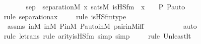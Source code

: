 \begin{isabellebody}
\isamarkupfalse%
\ {\isacharminus}{\kern0pt}\ \isanewline
\ \ \isamarkupfalse%
\ sep\ {\isacharcolon}{\kern0pt}\ {\isachardoublequoteopen}separation{\isacharparenleft}{\kern0pt}{\isacharhash}{\kern0pt}{\isacharhash}{\kern0pt}M{\isacharcomma}{\kern0pt}\ {\isasymlambda}x{\isachardot}{\kern0pt}\ sats{\isacharparenleft}{\kern0pt}M{\isacharcomma}{\kern0pt}\ is{\isacharunderscore}{\kern0pt}HS{\isacharunderscore}{\kern0pt}fm{\isacharparenleft}{\kern0pt}{}{\isacharcomma}{\kern0pt}\ {}{\isacharparenright}{\kern0pt}{\isacharcomma}{\kern0pt}\ {\isacharbrackleft}{\kern0pt}x{\isacharbrackright}{\kern0pt}\ {\isacharat}{\kern0pt}\ {\isacharbrackleft}{\kern0pt}{\isacharless}{\kern0pt}{\isasymF}{\isacharcomma}{\kern0pt}\ {\isasymG}{\isacharcomma}{\kern0pt}\ P{\isacharcomma}{\kern0pt}\ P{\isacharunderscore}{\kern0pt}auto{\isachargreater}{\kern0pt}{\isacharbrackright}{\kern0pt}{\isacharparenright}{\kern0pt}{\isacharparenright}{\kern0pt}{\isachardoublequoteclose}\isanewline
\ \ \ \ \isamarkupfalse%
{\isacharparenleft}{\kern0pt}rule\ separation{\isacharunderscore}{\kern0pt}ax{\isacharparenright}{\kern0pt}\isanewline
\ \ \ \ \isamarkupfalse%
{\isacharparenleft}{\kern0pt}rule\ is{\isacharunderscore}{\kern0pt}HS{\isacharunderscore}{\kern0pt}fm{\isacharunderscore}{\kern0pt}type{\isacharparenright}{\kern0pt}\isanewline
\ \ \ \ \isamarkupfalse%
\ assms\ {\isasymF}{\isacharunderscore}{\kern0pt}in{\isacharunderscore}{\kern0pt}M\ {\isasymG}{\isacharunderscore}{\kern0pt}in{\isacharunderscore}{\kern0pt}M\ P{\isacharunderscore}{\kern0pt}in{\isacharunderscore}{\kern0pt}M\ P{\isacharunderscore}{\kern0pt}auto{\isacharunderscore}{\kern0pt}in{\isacharunderscore}{\kern0pt}M\ pair{\isacharunderscore}{\kern0pt}in{\isacharunderscore}{\kern0pt}M{\isacharunderscore}{\kern0pt}iff\ \ \isanewline
\ \ \ \ \ \ \ \isamarkupfalse%
\ auto{\isacharbrackleft}{\kern0pt}{}{\isacharbrackright}{\kern0pt}\isanewline
\ \ \ \ \isamarkupfalse%
{\isacharparenleft}{\kern0pt}rule\ le{\isacharunderscore}{\kern0pt}trans{\isacharcomma}{\kern0pt}\ rule\ arity{\isacharunderscore}{\kern0pt}is{\isacharunderscore}{\kern0pt}HS{\isacharunderscore}{\kern0pt}fm{\isacharcomma}{\kern0pt}\ simp{\isacharcomma}{\kern0pt}\ simp{\isacharparenright}{\kern0pt}\isanewline
\ \ \ \ \isamarkupfalse%
{\isacharparenleft}{\kern0pt}rule\ Un{\isacharunderscore}{\kern0pt}least{\isacharunderscore}{\kern0pt}lt{\isacharparenright}{\kern0pt}\isanewline
\ \ \ \ \isamarkupfalse%

\end{isabellebody}
